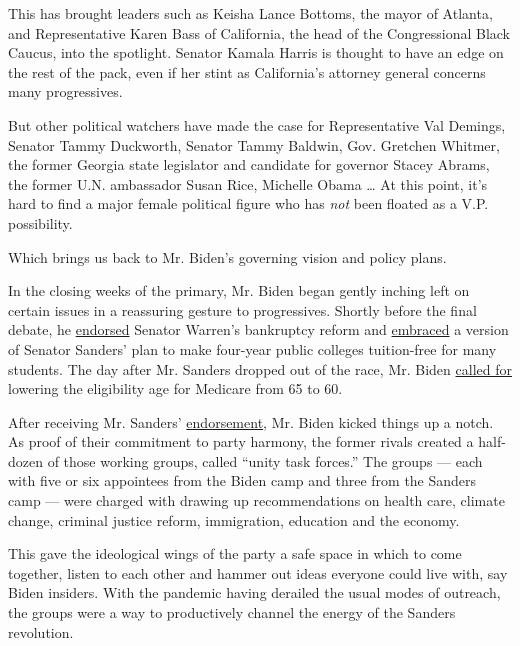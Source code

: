 This has brought leaders such as Keisha Lance Bottoms, the mayor of
Atlanta, and Representative Karen Bass of California, the head of the
Congressional Black Caucus, into the spotlight. Senator Kamala Harris is
thought to have an edge on the rest of the pack, even if her stint as
California's attorney general concerns many progressives.

But other political watchers have made the case for Representative Val
Demings, Senator Tammy Duckworth, Senator Tammy Baldwin, Gov. Gretchen
Whitmer, the former Georgia state legislator and candidate for governor
Stacey Abrams, the former U.N. ambassador Susan Rice, Michelle Obama
\ldots{} At this point, it's hard to find a major female political
figure who has \emph{not} been floated as a V.P. possibility.

Which brings us back to Mr. Biden's governing vision and policy plans.

In the closing weeks of the primary, Mr. Biden began gently inching left
on certain issues in a reassuring gesture to progressives. Shortly
before the final debate, he
\href{https://www.vox.com/2020/3/16/21181500/joe-biden-elizabeth-warren-bankruptcy}{endorsed}
Senator Warren's bankruptcy reform and
\href{https://www.nytimes3xbfgragh.onion/2020/03/15/us/politics/biden-backs-free-college.html}{embraced}
a version of Senator Sanders' plan to make four-year public colleges
tuition-free for many students. The day after Mr. Sanders dropped out of
the race, Mr. Biden
\href{https://www.npr.org/sections/health-shots/2020/04/11/832025550/bidens-health-play-in-a-covid-19-economy-lower-medicares-eligibility-age-to-60}{called
for} lowering the eligibility age for Medicare from 65 to 60.

After receiving Mr. Sanders'
\href{https://www.nytimes3xbfgragh.onion/2020/04/13/us/politics/bernie-sanders-joe-biden-endorsement.html}{endorsement},
Mr. Biden kicked things up a notch. As proof of their commitment to
party harmony, the former rivals created a half-dozen of those working
groups, called ``unity task forces.'' The groups --- each with five or
six appointees from the Biden camp and three from the Sanders camp ---
were charged with drawing up recommendations on health care, climate
change, criminal justice reform, immigration, education and the economy.

This gave the ideological wings of the party a safe space in which to
come together, listen to each other and hammer out ideas everyone could
live with, say Biden insiders. With the pandemic having derailed the
usual modes of outreach, the groups were a way to productively channel
the energy of the Sanders revolution.

